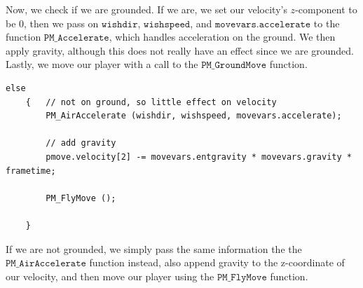 \documentclass{article}
\begin{document}
Now, we check if we are grounded. If we are, we set our velocity’s $z$-component to be 0, then we pass on $\texttt{wishdir}$, $\texttt{wishspeed}$, and $\texttt{movevars.accelerate}$ to the function $\texttt{PM\_Accelerate}$, which handles acceleration on the ground. We then apply gravity, although this does not really have an effect since we are grounded. Lastly, we move our player with a call to the $\texttt{PM\_GroundMove}$ function.
\begin{verbatim}
else
	{	// not on ground, so little effect on velocity
		PM_AirAccelerate (wishdir, wishspeed, movevars.accelerate);

		// add gravity
		pmove.velocity[2] -= movevars.entgravity * movevars.gravity * frametime;

		PM_FlyMove ();

	}
\end{verbatim}
If we are not grounded, we simply pass the same information the the $\texttt{PM\_AirAccelerate}$ function instead, also append gravity to the z-coordinate of our velocity, and then move our player using the $\texttt{PM\_FlyMove}$ function.
\end{document}
